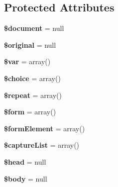 \subsection*{Protected Attributes}
\begin{DoxyCompactItemize}
\item 
\hypertarget{classDom_1_1Template_a798feecbbb5524e0f52c40ab3adacc60}{{\bfseries \$document} = null}\label{classDom_1_1Template_a798feecbbb5524e0f52c40ab3adacc60}

\item 
\hypertarget{classDom_1_1Template_ae7aea630903528a3732cca666d60b3a4}{{\bfseries \$original} = null}\label{classDom_1_1Template_ae7aea630903528a3732cca666d60b3a4}

\item 
\hypertarget{classDom_1_1Template_a5ce2e9482984800d7d0f09e28131d10c}{{\bfseries \$var} = array()}\label{classDom_1_1Template_a5ce2e9482984800d7d0f09e28131d10c}

\item 
\hypertarget{classDom_1_1Template_af13751848db82217acff30ea106c28ef}{{\bfseries \$choice} = array()}\label{classDom_1_1Template_af13751848db82217acff30ea106c28ef}

\item 
\hypertarget{classDom_1_1Template_a2bbeedefa302f7b3d3d9619070a43e83}{{\bfseries \$repeat} = array()}\label{classDom_1_1Template_a2bbeedefa302f7b3d3d9619070a43e83}

\item 
\hypertarget{classDom_1_1Template_a62040987a81f326c8d4fd055916d6271}{{\bfseries \$form} = array()}\label{classDom_1_1Template_a62040987a81f326c8d4fd055916d6271}

\item 
\hypertarget{classDom_1_1Template_a8a6d01cd5871dd65520fcd674644c72b}{{\bfseries \$form\+Element} = array()}\label{classDom_1_1Template_a8a6d01cd5871dd65520fcd674644c72b}

\item 
\hypertarget{classDom_1_1Template_a1e522688323a828ada4ccaf0d71a2abd}{{\bfseries \$capture\+List} = array()}\label{classDom_1_1Template_a1e522688323a828ada4ccaf0d71a2abd}

\item 
\hypertarget{classDom_1_1Template_a83eac3e82211a6d6739dcac58b85c253}{{\bfseries \$head} = null}\label{classDom_1_1Template_a83eac3e82211a6d6739dcac58b85c253}

\item 
\hypertarget{classDom_1_1Template_a13e332b1d9e0e64b89222b9757e58eaa}{{\bfseries \$body} = null}\label{classDom_1_1Template_a13e332b1d9e0e64b89222b9757e58eaa}


\end{DoxyCompactItemize}
